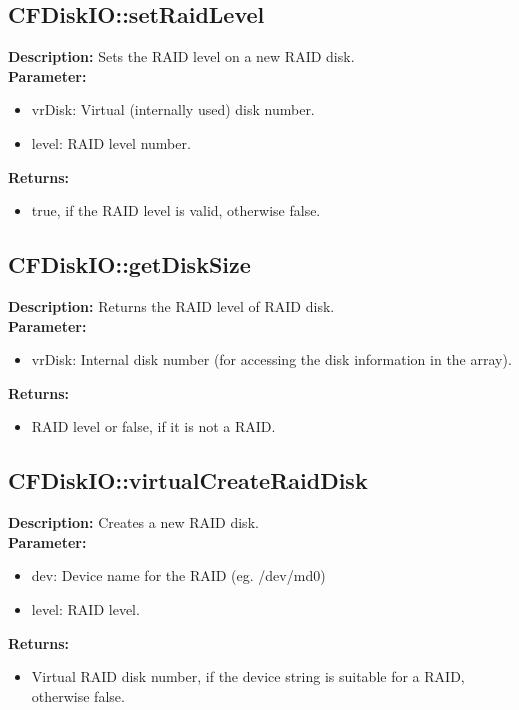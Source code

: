 \subsection{CFDiskIO::setRaidLevel}
\textbf{Description:} Sets the RAID level on a new RAID disk.\\
\textbf{Parameter:}
\begin{itemize}
\item vrDisk: Virtual (internally used) disk number.
\item level: RAID level number.
\end{itemize}
\textbf{Returns:}
\begin{itemize}
\item true, if the RAID level is valid, otherwise false.
\end{itemize}

\subsection{CFDiskIO::getDiskSize}
\textbf{Description:} Returns the RAID level of RAID disk.\\
\textbf{Parameter:}
\begin{itemize}
\item vrDisk: Internal disk number (for accessing the disk information in the array).
\end{itemize}
\textbf{Returns:}
\begin{itemize}
\item RAID level or false, if it is not a RAID.
\end{itemize}

\subsection{CFDiskIO::virtualCreateRaidDisk}
\textbf{Description:} Creates a new RAID disk.\\
\textbf{Parameter:}
\begin{itemize}
\item dev: Device name for the RAID (eg. /dev/md0)
\item level: RAID level.
\end{itemize}
\textbf{Returns:}
\begin{itemize}
\item Virtual RAID disk number, if the device string is suitable for a RAID, otherwise false.
\end{itemize}

